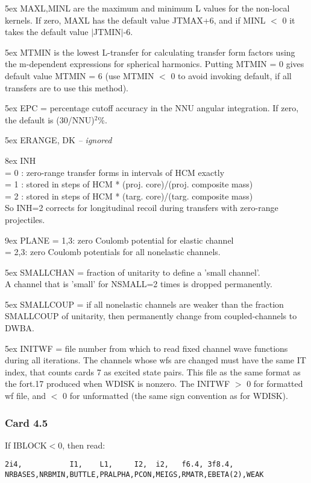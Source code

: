 \documentclass[11pt]{article}
\begin{document}
\hangindent 5ex
MAXL,MINL are the maximum and minimum L values
for the non-local
kernels. If zero, MAXL has the default value JTMAX+6, and
if MINL $<$ 0 it takes the default value $|$JTMIN$|$-6.


\hangindent 5ex
MTMIN is the lowest L-transfer for calculating transfer form factors
using the m-dependent expressions for spherical harmonics.
Putting MTMIN = 0 gives default value MTMIN = 6 (use MTMIN $<$ 0 to avoid
invoking default, if all transfers are to use this method).


\hangindent 5ex
EPC = percentage cutoff accuracy in the
NNU angular integration.
If zero, the default is (30/NNU)$^2$\%.

\hangindent 5ex
ERANGE, DK   {\em -- ignored}

\hangindent 8ex  INH
\\ = 0 : zero-range transfer forms in intervals of HCM exactly
\\ = 1 : stored in steps of HCM * (proj. core)/(proj. composite mass)
\\ = 2 : stored in steps of HCM * (targ. core)/(targ. composite mass)\\
    So INH=2 corrects for longitudinal recoil during transfers with zero-range projectiles.



\hangindent 9ex
PLANE = 1,3: zero Coulomb potential for elastic channel\\
      = 2,3: zero Coulomb potentials for all nonelastic channels.


\hangindent 5ex
SMALLCHAN = fraction of unitarity to define a 'small channel'.\\
A channel that is 'small' for NSMALL=2 times is dropped permanently.

\hangindent 5ex
SMALLCOUP = if all nonelastic channels are weaker than the fraction
SMALLCOUP of unitarity, then permanently change from coupled-channels to DWBA.

\hangindent 5ex
INITWF = file number from which to read fixed channel  wave functions during all iterations. The channels whose wfs are changed must have the same
IT  index, that counts cards 7 as excited state pairs.
This file as the same format as the fort.17 produced when WDISK is nonzero. 
The INITWF $>$ 0 for formatted wf file, and $<$ 0 for unformatted (the same sign convention as for WDISK).

\subsubsection*{Card 4.5}
If IBLOCK$<$0, then read:
\begin{verbatim}
2i4,           I1,    L1,     I2,  i2,   f6.4, 3f8.4,
NRBASES,NRBMIN,BUTTLE,PRALPHA,PCON,MEIGS,RMATR,EBETA(2),WEAK
\end{verbatim}
\end{document}
